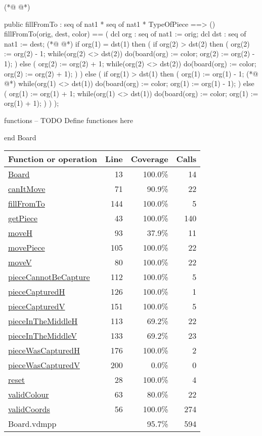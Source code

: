 \begin{vdmpp}[breaklines=true]
(*@
\label{fillFromTo:144}
@*)
 
 
 public fillFromTo : seq of nat1 * seq of nat1 * TypeOfPiece ==> ()
 fillFromTo(orig, dest, color) ==
 (
  dcl org : seq of nat1 := orig;
  dcl dst : seq of nat1 := dest;
(*@
\label{pieceCapturedV:151}
@*)
  if org(1) = dst(1)
  then
  (
   if org(2) > dst(2)
   then
   (
    org(2) := org(2) - 1;
    while(org(2) <> dst(2))
    do(board(org) := color;
     org(2) := org(2) - 1);
   )
   else
   (
    org(2) := org(2) + 1;
    while(org(2) <> dst(2))
    do(board(org) := color;
     org(2) := org(2) + 1);
   )
  )
  else
  (
   if org(1) > dst(1)
   then
   (
    org(1) := org(1) - 1;
(*@
\label{pieceWasCapturedH:176}
@*)
    while(org(1) <> dst(1))
    do(board(org) := color;
     org(1) := org(1) - 1);
   )
   else
   (
    org(1) := org(1) + 1;
    while(org(1) <> dst(1))
    do(board(org) := color;
     org(1) := org(1) + 1);
   )   
  ) 
 );

functions
-- TODO Define functiones here

end Board
\end{vdmpp}
\bigskip
\begin{longtable}{|l|r|r|r|}
\hline
Function or operation & Line & Coverage & Calls \\
\hline
\hline
\hyperref[Board:13]{Board} & 13&100.0\% & 14 \\
\hline
\hyperref[canItMove:71]{canItMove} & 71&90.9\% & 22 \\
\hline
\hyperref[fillFromTo:144]{fillFromTo} & 144&100.0\% & 5 \\
\hline
\hyperref[getPiece:43]{getPiece} & 43&100.0\% & 140 \\
\hline
\hyperref[moveH:93]{moveH} & 93&37.9\% & 11 \\
\hline
\hyperref[movePiece:105]{movePiece} & 105&100.0\% & 22 \\
\hline
\hyperref[moveV:80]{moveV} & 80&100.0\% & 22 \\
\hline
\hyperref[pieceCannotBeCapture:112]{pieceCannotBeCapture} & 112&100.0\% & 5 \\
\hline
\hyperref[pieceCapturedH:126]{pieceCapturedH} & 126&100.0\% & 1 \\
\hline
\hyperref[pieceCapturedV:151]{pieceCapturedV} & 151&100.0\% & 5 \\
\hline
\hyperref[pieceInTheMiddleH:113]{pieceInTheMiddleH} & 113&69.2\% & 22 \\
\hline
\hyperref[pieceInTheMiddleV:133]{pieceInTheMiddleV} & 133&69.2\% & 23 \\
\hline
\hyperref[pieceWasCapturedH:176]{pieceWasCapturedH} & 176&100.0\% & 2 \\
\hline
\hyperref[pieceWasCapturedV:200]{pieceWasCapturedV} & 200&0.0\% & 0 \\
\hline
\hyperref[reset:28]{reset} & 28&100.0\% & 4 \\
\hline
\hyperref[validColour:63]{validColour} & 63&80.0\% & 22 \\
\hline
\hyperref[validCoords:56]{validCoords} & 56&100.0\% & 274 \\
\hline
\hline
Board.vdmpp & & 95.7\% & 594 \\
\hline
\end{longtable}

